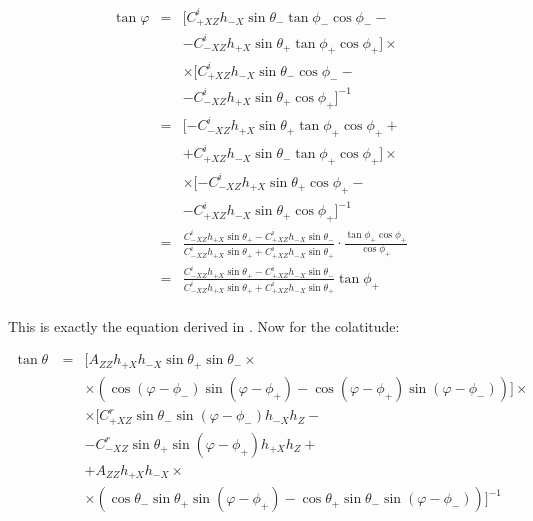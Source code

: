 \documentclass[a4paper,10pt]{thesis}
\begin{document}
\begin{eqnarray}\label{tan_phi_cecconi}
\tan \varphi &=& [C_{+XZ}^i h_{-X} \sin \theta_- \tan \phi_- \cos \phi_- -\\
&&-C_{-XZ}^i h_{+X} \sin \theta_+ \tan \phi_+ \cos \phi_+] \times \nonumber \\
&&\times[C_{+XZ}^i h_{-X} \sin \theta_- \cos \phi_- -\nonumber \\
&&-  C_{-XZ}^i h_{+X} \sin \theta_+  \cos \phi_+]^{-1}\nonumber\\
&=& [-C_{-XZ}^i h_{+X} \sin \theta_+ \tan \phi_+ \cos \phi_+ +\\
&& + C_{+XZ}^i h_{-X} \sin \theta_- \tan \phi_+ \cos \phi_+] \times \nonumber \\
&&\times [- C_{-XZ}^i h_{+X} \sin \theta_+  \cos \phi_+ - \nonumber \\
&& -  C_{+XZ}^i h_{-X} \sin \theta_+ \cos \phi_+]^{-1}\nonumber\\
&=& \frac{C_{-XZ}^i h_{+X} \sin \theta_+ - C_{+XZ}^i h_{-X} \sin \theta_-}{C_{-XZ}^i h_{+X} \sin \theta_+ + C_{+XZ}^i h_{-X} \sin \theta_+} \cdot \frac{\tan \phi_+ \cos \phi_+}{\cos \phi_+}\\
&=& \frac{C_{-XZ}^i h_{+X} \sin \theta_+ - C_{+XZ}^i h_{-X} \sin \theta_-}{C_{-XZ}^i h_{+X} \sin \theta_+ + C_{+XZ}^i h_{-X} \sin \theta_+}\tan \phi_+
\end{eqnarray}

\paragraph*{}
This is exactly the equation derived in \cite{cecconi04}. Now for the colatitude:

\begin{eqnarray}\label{tan_theta_cecconi}
\tan \theta\  &=&
[A_{ZZ} h_{+X}h_{-X} \sin \theta_+  \sin \theta_- \times \\
&& \times ( \cos (\varphi - \phi_-)  \sin (\varphi - \phi_+) -\cos (\varphi - \phi_+)  \sin (\varphi - \phi_-))]\times \nonumber \\
&& \times [C_{+XZ}^r \sin \theta_-  \sin (\varphi - \phi_-) h_{-X} h_{Z} - \nonumber \\
&& - C_{-XZ}^r \sin \theta_+  \sin (\varphi - \phi_+) h_{+X} h_{Z} + \nonumber \\
&&+ A_{ZZ} h_{+X} h_{-X} \times \nonumber \\
&&\times (\cos \theta_- \sin \theta_+  \sin (\varphi - \phi_+ )-\cos \theta_+  \sin \theta_-  \sin (\varphi - \phi_-))]^{-1} \nonumber
\end{eqnarray}
\end{document}
